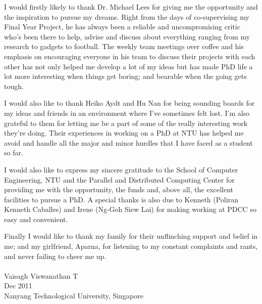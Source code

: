 
\begin{acknowledgements}

I would firstly likely to thank Dr. Michael Lees for giving me the opportunity and the inspiration to pursue my dreams. Right from the days of co-supervising my Final Year Project, he has always been a reliable and uncompromising critic who's been there to help, advise and discuss about everything ranging from my research to gadgets to football. The weekly team meetings over coffee and his emphasis on encouraging everyone in his team to discuss their projects with each other has not only helped me develop a lot of my ideas but has made PhD life a lot more interesting when things get boring; and bearable when the going gets tough. 

I would also like to thank Heiko Aydt and Hu Nan for being sounding boards for my ideas and friends in an environment where I've sometimes felt lost. I'm also grateful to them for letting me be a part of some of the really interesting work they're doing. Their experiences in working on a PhD at NTU has helped me avoid and handle all the major and minor hurdles that I have faced as a student so far.

I would also like to express my sincere gratitude to the School of Computer Engineering, NTU and the Parallel and Distributed Computing Center for providing me with the opportunity, the funds and, above all, the excellent facilities to pursue a PhD. A special thanks is also due to Kenneth (Poliran Kenneth Caballes) and Irene (Ng-Goh Siew Lai) for making working at PDCC so easy and convenient.

Finally I would like to thank my family for their unflinching support and belief in me; and my girlfriend, Aparna, for listening to my constant complaints and rants, and never failing to cheer me up. \\
\\
\hspace{0in}
Vaisagh Viswanathan T\\
Dec 2011\\
{Nanyang Technological University, Singapore}\\
\end{acknowledgements}
